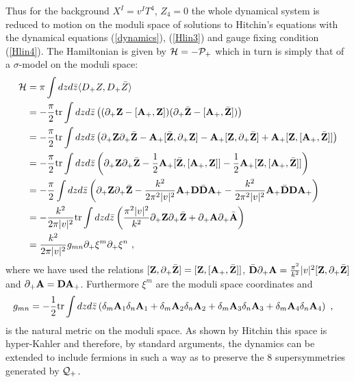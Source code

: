 \documentclass[12pt]{article}
\newcommand{\nn}{\nonumber}
\numberwithin{equation}{section}
\begin{document}
Thus for the background $X^I=v^IT^4$, $Z_4=0$ the whole dynamical system is reduced to  motion on the moduli space of solutions to Hitchin's equations with the dynamical equations (\ref{dynamics}), (\ref{Hlin3}) and gauge fixing condition (\ref{Hlin4}).  The Hamiltonian is given  by ${\cal H} = -{\cal P}_+$ which in turn is simply that of a $\sigma$-model on the moduli space:
\begin{align}
{\cal H} & = \pi \int dzd\bar z \langle D_+Z,D_+{\bar Z}\rangle\nn\\
 & = -\frac{\pi}{2}{\rm tr} \int dzd\bar z \left((\partial_+{\bf Z} -[{\bf A_+},{\bf Z}] )(\partial_+\bar {\bf Z} -[{\bf A}_+,\bar {\bf Z}])\right)\nn\\
 &=- \frac{\pi}{2}{\rm tr} \int dzd\bar z \left( \partial_+{\bf Z} \partial_+\bar {\bf Z} - {\bf A}_+[\bar {\bf Z},\partial_+{\bf Z}] -   {\bf A}_+[ {\bf Z},\partial_+\bar{\bf Z}] + {\bf A}_+[ {\bf Z} ,[ {\bf A}_+,\bar {\bf Z}]]\right)\nn\\
  &=- \frac{\pi}{2}{\rm tr} \int dzd\bar z \left( \partial_+{\bf Z} \partial_+\bar {\bf Z}  -\frac12  {\bf A}_+[\bar {\bf Z},[{\bf A}_+, {\bf Z}]] -  \frac12 {\bf A}_+[ {\bf Z},[{\bf A}_+,\bar {\bf Z}]] \right)\nn\\
 & =  -\frac{\pi}{2} \int dzd\bar z \left(\partial_+{\bf Z}\partial_+\bar{\bf Z} -  \frac{k^2}{2\pi^2 |v|^2}{\bf A_+}{\bf D}\bar {\bf D}{\bf A_+}-  \frac{k^2}{2\pi^2 |v|^2}{\bf A_+}\bar{\bf D} {\bf D}{\bf A_+}\right)\nn\\
& = -\frac{k^2}{2\pi |v|^2}{\rm tr}\int dzd\bar z \left(   \frac{  \pi^2 |v|^2}{k^2}\partial_+{\bf Z} \partial_+\bar  {\bf Z}+  \partial_+{\bf A} \partial_+\bar  {\bf A} \right)\nn\\
& = \frac{k^2}{ 2\pi |v|^2}g_{mn}\partial_+ \xi^m\partial_+ \xi^n\ ,
\end{align}
where we have used the relations $[{\bf Z},\partial_+\bar {\bf Z}]= [{\bf Z},[{\bf A}_+,\bar {\bf Z}]]$,  $\bar {\bf D}  \partial_+{\bf A}  = \frac{\pi^2}{k^2}|v|^2[ {\bf Z},\partial_+ \bar {\bf Z}]$ and $\partial_+{\bf A} = {\bf D}{\bf A}_+$. Furthermore  
$\xi^m$ are the moduli space coordinates and  
\begin{align}
g_{mn} & =  -\frac{1}{2}{\rm tr}\int dzd\bar z \left( \delta_m{\bf A}_1\delta_n  {\bf A}_1+\delta_m{\bf A}_2\delta_n  {\bf A}_2+ \delta_m{\bf A}_3\delta_n{\bf A}_3+\delta_m {\bf A}_4\delta_n {\bf A}_4 \right)\ ,
\end{align}
is the natural metric on the moduli space. As shown by Hitchin \cite{Hitchin:1986vp} this space is hyper-Kahler and therefore, by standard arguments, the dynamics can be extended to include fermions in such a way as to preserve the 8 supersymmetries generated by ${\cal Q}_+$. 
\end{document}
